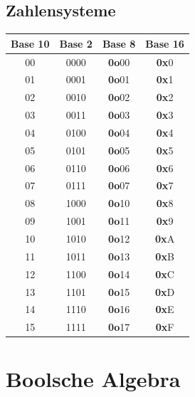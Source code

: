 \documentclass[6pt,a4paper]{scrartcl}
\renewcommand{\emph}[1]{\textsf{\textbf{#1}}}
\begin{document}
\begin{multicols*}{3}
\subsection{Zahlensysteme}

	\begin{tabular} {c|c|c|c}
		Base 10 & Base 2 & Base 8 & Base 16 \\
		\hline
			00 & 0000 & \emph{0o}00 & \emph{0x}0 \\
			01 & 0001 & \emph{0o}01 & \emph{0x}1 \\
			02 & 0010 & \emph{0o}02 & \emph{0x}2 \\
			03 & 0011 & \emph{0o}03 & \emph{0x}3 \\
			04 & 0100 & \emph{0o}04 & \emph{0x}4 \\
			05 & 0101 & \emph{0o}05 & \emph{0x}5 \\
			06 & 0110 & \emph{0o}06 & \emph{0x}6 \\
			07 & 0111 & \emph{0o}07 & \emph{0x}7 \\
			08 & 1000 & \emph{0o}10 & \emph{0x}8 \\
			09 & 1001 & \emph{0o}11 & \emph{0x}9 \\
			10 & 1010 & \emph{0o}12 & \emph{0x}A \\
			11 & 1011 & \emph{0o}13 & \emph{0x}B \\
			12 & 1100 & \emph{0o}14 & \emph{0x}C \\
			13 & 1101 & \emph{0o}15 & \emph{0x}D \\
			14 & 1110 & \emph{0o}16 & \emph{0x}E \\
			15 & 1111 & \emph{0o}17 & \emph{0x}F
	\end{tabular}

\section{Boolsche Algebra}

\end{multicols*}
\end{document}
